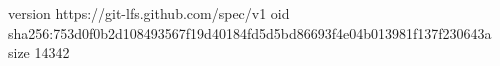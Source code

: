 version https://git-lfs.github.com/spec/v1
oid sha256:753d0f0b2d108493567f19d40184fd5d5bd86693f4e04b013981f137f230643a
size 14342
